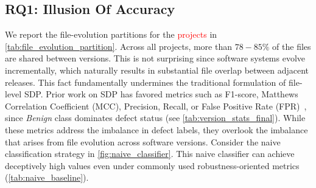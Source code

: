 \documentclass[authoryear,final,5p,times,twocolumn]{elsarticle}
\theoremstyle{plain}
\begin{document}
\subsection{RQ1: Illusion Of Accuracy}
\label{sec:RQ1}
We report the file-evolution partitions for the \textcolor{red}{projects} in \autoref{tab:file_evolution_partition}. Across all projects, more than $78-85\%$ of the files are shared between versions. This is not surprising since software systems evolve incrementally, which naturally results in substantial file overlap between adjacent releases. This fact fundamentally undermines the traditional formulation of file-level SDP. Prior work on SDP has favored metrics such as F1-score, Matthews Correlation Coefficient (MCC), Precision, Recall, or False Positive Rate (FPR)~\citep{yang2025dlap}, since \textit{Benign} class dominates defect status (see \autoref{tab:version_stats_final}).
While these metrics address the imbalance in defect labels, they overlook the imbalance that arises from file evolution across software versions. Consider the naive classification strategy in \autoref{fig:naive_classifier}. This naive classifier can achieve deceptively high values even under commonly used robustness-oriented metrics (\autoref{tab:naive_baseline}).
\end{document}
